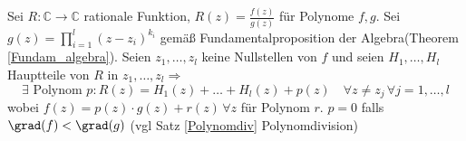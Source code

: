\begin{proposition}
    Sei $R: \mathbb{C} \to \mathbb{C}$ rationale Funktion, $R(z)=\frac{f(z)}{g(z)}$ für Polynome $f,g$. Sei $g(z) = \prod_{i=1}^{l}(z-z_i)^{k_i}$ gemäß Fundamentalproposition der Algebra(Theorem \ref{Fundam_algebra}). Seien $z_1,\dots,z_l$ keine Nullstellen von $f$ und seien $H_1,\dots,H_l$ Hauptteile von $R$ in $z_1,\dots,z_l \Rightarrow$
    \[
    \exists \text{ Polynom } p:R(z)=H_1(z)+\dots+H_l(z)+p(z) \quad\forall z \neq z_j \,\forall j = 1,\dots,l
    \]
    wobei $f(z) = p(z)\cdot g(z) + r(z)\,\forall z$ für Polynom $r$. $p=0$ falls $\grad(f) < \grad(g)$ (vgl Satz \ref{Polynomdiv} Polynomdivision)
\end{proposition}